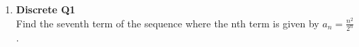 \documentclass{article}
\begin{document}
\begin{enumerate}
    \item \textbf{Discrete Q1}\\
          Find the seventh term of the sequence where the nth term is given by \(a_n = \frac{n^2}{2^n}\).

\end{enumerate}
\end{document}
